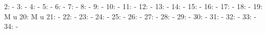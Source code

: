 \documentclass[nojss]{jss}
\begin{document}
\begin{Schunk}
\begin{Soutput}
  2:                                                                          -
  3:                                                                          -
  4:                                                                          -
  5:                                                                          -
  6:                                                                          -
  7:                                                                          -
  8:                                                                          -
  9:                                                                          -
 10:                                                                          -
 11:                                                                          -
 12:                                                                          -
 13:                                                                          -
 14:                                                                          -
 15:                                                                          -
 16:                                                                          -
 17:                                                                          -
 18:                                                                          -
 19:                                          M                               u
 20:                                          M                               u
 21:                                                                          -
 22:                                                                          -
 23:                                                                          -
 24:                                                                          -
 25:                                                                          -
 26:                                                                          -
 27:                                                                          -
 28:                                                                          -
 29:                                                                          -
 30:                                                                          -
 31:                                                                          -
 32:                                                                          -
 33:                                                                          -
 34:                                                                          -

\end{Soutput}
\end{Schunk}
\end{document}
